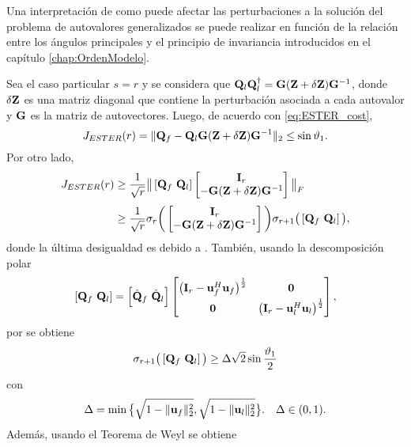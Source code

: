 	
	Una interpretación de como puede afectar las perturbaciones a la solución del problema de autovalores generalizados se puede realizar en función de la relación entre los ángulos principales y el principio de invariancia introducidos en el capítulo \eqref{chap:OrdenModelo}. 
	
	Sea el caso particular $s=r$ y se considera que $\mathbf{Q}_l\mathbf{Q}_l^\dagger = \mathbf{G}(\mathbf{Z} + \delta\mathbf{Z})\mathbf{G}^{-1}$, donde $\delta\mathbf{Z}$ es una matriz diagonal que contiene la perturbación asociada a cada autovalor y $\mathbf{G}$ es la matriz de autovectores. Luego, de acuerdo con \eqref{eq:ESTER_cost},
	\begin{equation} J_{ESTER}(r) = \|\mathbf{Q}_f -\mathbf{Q}_l\mathbf{G}(\mathbf{Z}+\delta\mathbf{Z})\mathbf{G}^{-1}\|_2\le \sin\vartheta_1. \label{eq:Jester_appendix}\end{equation}
	Por otro lado,
	\begin{equation}
	\begin{aligned} 
	J_{ESTER}(r) & \ge \frac{1}{\sqrt{r}}\big\|\left[ \matQ_f\ \matQ_l\right]\begin{bmatrix} \matI_r \\ -\matG(\matZ+\delta\matZ)\matG^{-1}\end{bmatrix} \big\|_F\\[0.3em]  & \ge \frac{1}{\sqrt{r}}\sigma_r\bigg(\begin{bmatrix} \matI_r \\ -\matG(\matZ+\delta\matZ)\matG^{-1}\end{bmatrix}\bigg)\sigma_{r+1}\big(\left[ \matQ_f\ \matQ_l\right]\big),
	\end{aligned}
	\label{Eq:vartheta2_1}
	\end{equation}
	donde la última desigualdad es debido a \cite[Teo. 2]{WANG1997}. También, usando la descomposición polar \cite{Horn1991}
	\[\left[\mathbf{Q}_f\ \mathbf{Q}_l\right] = \left[\hat{\mathbf{Q}}_f\ \hat{\mathbf{Q}}_l\right]\begin{bmatrix} \big(\mathbf{I}_r-\mathbf{u}_f^H\mathbf{u}_f\big)^{\frac{1}{2}} & \mathbf{0} \\[0.3em] \mathbf{0} & \big(\mathbf{I}_r-\mathbf{u}_l^H\mathbf{u}_l\big)^{\frac{1}{2}} 
	\end{bmatrix},\]
	por \cite{Horn1990} se obtiene
	\begin{equation}
	\sigma_{r+1}\big(\left[ \matQ_f\ \matQ_l\right]\big)\ge \Delta\sqrt{2}\sin\frac{\vartheta_1}{2}
	\label{Eq:sigma_r+1}
	\end{equation}
	con 
	\[\Delta = \min\big\{\sqrt{1-\|\mathbf{u}_f\|_2^2}, \sqrt{1-\|\mathbf{u}_l\|_2^2}\big\}. \quad \Delta\in(0,1).\]
	Además, usando el Teorema de Weyl \cite{Horn1991} se obtiene
